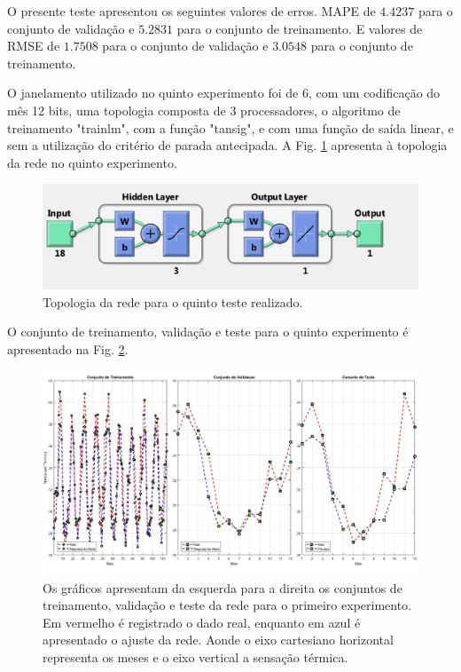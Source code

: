 \documentclass[journal, a4paper]{IEEEtran}
\begin{document}
O presente teste apresentou os seguintes valores de erros. MAPE de $4.4237$ para o conjunto de validação e $5.2831$ para o conjunto de treinamento. E valores de RMSE de $1.7508$ para o conjunto de validação e $3.0548$ para o conjunto de treinamento. 

O janelamento utilizado no quinto experimento foi de 6, com um codificação do mês 12 bits, uma topologia composta de $3$ processadores, o algoritmo de treinamento "trainlm", com a função "tansig", e com uma função de saída linear, e sem a utilização do critério de parada antecipada. A Fig. \ref{topo5} apresenta à topologia da rede no quinto experimento. 

\begin{figure}[H]
	\centering
	\includegraphics[scale=0.5]{Images/topologia5.jpg}
	\caption{Topologia da rede para o quinto teste realizado.}
	\label{topo5}
\end{figure} 


O conjunto de treinamento, validação e teste para o quinto experimento é apresentado na Fig. \ref{teste5}.

\begin{figure}[H]
	\centering
	\includegraphics[scale=0.15]{Images/Teste5.jpg}
	\caption{Os gráficos apresentam da esquerda para a direita os conjuntos de treinamento, validação e teste da rede para o primeiro experimento. Em vermelho é registrado o dado real, enquanto em azul é apresentado o ajuste da rede. Aonde o eixo cartesiano horizontal representa os meses e o eixo vertical a sensação térmica.}
	\label{teste5}
\end{figure} 
\end{document}
